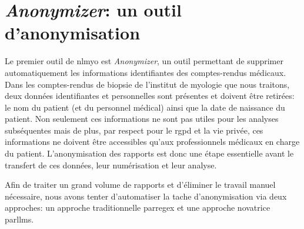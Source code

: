\section{\textit{Anonymizer}: un outil d'anonymisation}
Le premier outil de \gls{nlmyo} est \textit{Anonymizer}, un outil permettant de supprimer automatiquement les informations identifiantes des comptes-rendus médicaux. Dans les comptes-rendus de biopsie de l'institut de myologie que nous traitons, deux données identifiantes et personnelles sont présentes et doivent être retirées: le nom du patient (et du personnel médical) ainsi que la date de naissance du patient. Non seulement ces informations ne sont pas utiles pour les analyses subséquentes mais de plus, par respect pour le \gls{rgpd} et la vie privée, ces informations ne doivent être accessibles qu'aux professionnels médicaux en charge du patient. L'anonymisation des rapports est donc une étape essentielle avant le transfert de ces données, leur numérisation et leur analyse.

Afin de traiter un grand volume de rapports et d'éliminer le travail manuel nécessaire, nous avons tenter d'automatiser la tache d'anonymisation via deux approches: un approche traditionnelle par\gls{regex} et une approche novatrice par\gls{llms}.

